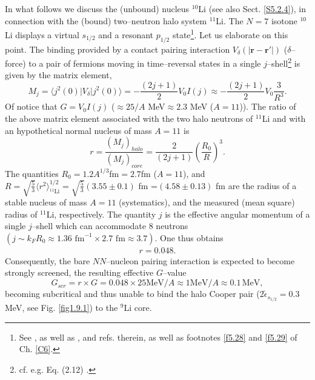  In what follows we discuss the (unbound) nucleus $^{10}$Li (see also Sect. \ref{S5.2.4}), in connection with the (bound) two--neutron halo system $^{11}$Li. The $N=7$ isotone $^{10}$Li displays a virtual $s_{1/2}$ and a resonant $p_{1/2}$ state\footnote{See  \cite{Cavallaro:17}, as well as \cite{Barranco:20}, \cite{Moro:19} and refs. therein, as well as footnotes \ref{f5.28} and \ref{f5.29} of Ch. \ref{C6}.}. Let us elaborate on this point. 
The binding provided by a contact pairing interaction $V_\delta (|\mathbf{r}-\mathbf{r}'|)$ ($\delta$--force) to a pair of fermions moving in time--reversal states in a single $j$--shell\footnote{cf. e.g. Eq. (2.12) \cite{Brink:05}.} is given by the matrix element,
\begin{equation}
M_j=\langle j^2(0)|V_\delta|j^2(0)\rangle=-\frac{(2j+1)}{2} V_0 I(j)\approx -\frac{(2j+1)}{2}V_0\frac{3}{R^3}.
\end{equation} 
Of notice that $G=V_0I(j)$ ($\approx 25/A$ MeV$\approx 2.3$ MeV ($A=11$)). 
The ratio of the above matrix element associated with the two halo neutrons of $^{11}$Li and with an hypothetical normal nucleus of mass $A=11$ is
\begin{equation}
r=\frac{(M_j)_{halo}}{(M_j)_{core}}=\frac{2}{(2j+1)}\left(\frac{R_0}{R}\right)^3.
\end{equation}
The quantities $R_0=1.2 A^{1/3}$fm$=2.7$fm ($A=11$), and $R=\sqrt{\frac{5}{3}}\langle r^2\rangle^{1/2}_{^{11}\text{Li}}=\sqrt{\frac{5}{3}}(3.55\pm0.1)$ fm =$(4.58\pm 0.13)$ fm are the radius of a stable nucleus of mass $A=11$ (systematics), and  the measured (mean square) radius of $^{11}$Li, respectively. The quantity $j$ is the effective angular momentum of a single $j$--shell which can accommodate 8 neutrons $(j\sim k_F R_0\approx 1.36 \text{ fm}^{-1}\times2.7\text{ fm}\approx3.7)$. One thus obtains
\begin{align}\label{eq2.6.3}
r=0.048.
\end{align}
 Consequently, the bare $NN$--nucleon pairing interaction is expected to become strongly screened, the resulting effective $G$--value 
\begin{equation}\label{eq1C2AppF}
G_{scr}=r\times G=0.048\times 25 \text{MeV}/A\approx 1 \text{MeV}/A\approx 0.1\,\text{MeV},
\end{equation}
becoming subcritical and thus unable to bind the halo Cooper pair ($2\tilde \epsilon_{s_{1/2}}=0.3$ MeV, see Fig. \ref{fig1.9.1}) to the $^9$Li core.


